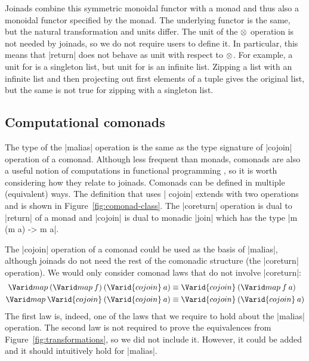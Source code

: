 \documentclass{sigplanconf}
\begin{document}
Joinads combine this symmetric monoidal functor with a monad and thus also a monoidal functor 
specified by the monad. The underlying functor is the same, but the natural transformation and units 
differ. The unit of the $\otimes$ operation is not needed by joinads, so we do not require users to 
define it. In particular, this means that |return| does not behave as unit with respect to $\otimes$. 
For example, a unit for  is a singleton list, but unit for  is an infinite
list. Zipping a list with an infinite list and then projecting out first elements of a tuple
gives the original list, but the same is not true for zipping with a singleton list.


\subsection{Computational comonads}
\label{sec:theory-comonads}

The type of the |malias| operation is the same as the type signature of |cojoin| operation of a 
comonad. Although less frequent than monads, comonads are also a useful notion of computations in 
functional programming \cite{comomads-ypnos, comonads-dataflow}, so it is worth considering how they 
relate to joinads. Comonads can be defined in multiple (equivalent) ways. The definition that uses |
cojoin| extends  with two operations and is shown in Figure~\ref{fig:comonad-class}. 
The |coreturn| operation is dual to |return| of a monad and |cojoin| is dual to monadic |join| which 
has the type |m (m a) -> m a|.

The |cojoin| operation of a comonad could be used as the basis of |malias|, although joinads do not 
need the rest of the comonadic structure (the |coreturn| operation).
We would only consider comonad laws that do not involve |coreturn|:
\begin{align*}
\map \: (\map \: f) \: (\Varid{cojoin} \: a) &\equiv \Varid{cojoin} \: (\map \: f \: a)\\
\map \: \Varid{cojoin} \: (\Varid{cojoin} \: a) &\equiv \Varid{cojoin} \: (\Varid{cojoin} \: a)
\end{align*}
The first law is, indeed, one of the laws that we require to hold about the |malias| operation.
The second law is not required to prove the equivalences from Figure~\ref{fig:transformations},
so we did not include it. However, it could be added and it should intuitively hold for |malias|.
\end{document}
